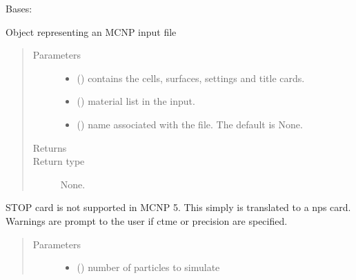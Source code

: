 \documentclass[letterpaper,10pt,english]{sphinxmanual}
\begin{document}
\begin{fulllineitems}
\label{\detokenize{api/inputgeneration:inputfile.D1S5_InputFile}}
Bases: {\hyperref[\detokenize{api/inputgeneration:inputfile.D1S_Input}]{}}

Object representing an MCNP input file
\begin{quote}\begin{description}
\item[{Parameters}] \leavevmode\begin{itemize}
\item {} 
 () \textendash{} contains the cells, surfaces, settings and title cards.

\item {} 
 () \textendash{} material list in the input.

\item {} 
 (\sphinxstyleliteralemphasis{\sphinxupquote{, }}) \textendash{} name associated with the file. The default is None.

\end{itemize}

\item[{Returns}] \leavevmode


\item[{Return type}] \leavevmode
None.

\end{description}\end{quote}

\begin{fulllineitems}
\label{\detokenize{api/inputgeneration:inputfile.D1S5_InputFile.add_stopCard}}
STOP card is not supported in MCNP 5. This simply is translated to a
nps card. Warnings are prompt to the user if ctme or precision are
specified.
\begin{quote}\begin{description}
\item[{Parameters}] \leavevmode\begin{itemize}
\item {} 
 () \textendash{} number of particles to simulate


\end{itemize}
\end{description}
\end{quote}
\end{fulllineitems}
\end{fulllineitems}
\end{document}
